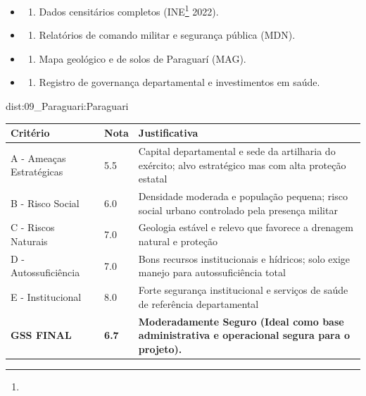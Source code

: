 {\begin{itemize}
\tightlist
\item
  \begin{enumerate}
  \def\labelenumi{\arabic{enumi})}
  \tightlist
  \item
    Dados censitários completos (INE\footnote{\fineINE} 2022).
  \end{enumerate}
\item
  \begin{enumerate}
  \def\labelenumi{\arabic{enumi})}
  \setcounter{enumi}{1}
  \tightlist
  \item
    Relatórios de comando militar e segurança pública (MDN).
  \end{enumerate}
\item
  \begin{enumerate}
  \def\labelenumi{\arabic{enumi})}
  \setcounter{enumi}{2}
  \tightlist
  \item
    Mapa geológico e de solos de Paraguarí (MAG).
  \end{enumerate}
\item
  \begin{enumerate}
  \def\labelenumi{\arabic{enumi})}
  \setcounter{enumi}{3}
  \tightlist
  \item
    Registro de governança departamental e investimentos em saúde.
  \end{enumerate}
\end{itemize}}{dist:09_Paraguari:Paraguari}
\begin{table}[ht!]
\small \begin{tabular}{p{3.0cm}p{0.8cm}p{6.0cm}} \toprule
\textbf{Critério} & \textbf{Nota} & \textbf{Justificativa} \\ \midrule
A - Ameaças Estratégicas & 5.5 & Capital departamental e sede da artilharia do exército; alvo estratégico mas com alta proteção estatal \\
B - Risco Social & 6.0 & Densidade moderada e população pequena; risco social urbano controlado pela presença militar \\
C - Riscos Naturais & 7.0 & Geologia estável e relevo que favorece a drenagem natural e proteção \\
D - Autossuficiência & 7.0 & Bons recursos institucionais e hídricos; solo exige manejo para autossuficiência total \\
E - Institucional & 8.0 & Forte segurança institucional e serviços de saúde de referência departamental \\
\midrule \textbf{GSS FINAL} & \textbf{6.7} & \textbf{Moderadamente Seguro (Ideal como base administrativa e operacional segura para o projeto).} \\ \bottomrule \end{tabular}
\end{table}
